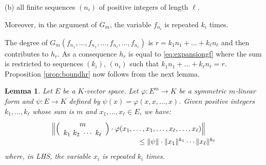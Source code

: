 \documentclass{sig-alternate}
\newtheorem{lem}[theo]{Lemma}
\def\binom#1#2{\Big(\begin{array}{cc} #1 \\ #2 \end{array}\Big)}
\begin{document}
\noindent
(b) all finite sequences $(n_i)$ of positive integers of length
$\ell$.

\noindent
Moreover, in the argument of $G_m$, the variable $f_{n_i}$ 
is repeated $k_i$ times.

The degree of $G_m(f_{n_1}, \ldots, f_{n_1}, \ldots, f_{n_\ell},
\ldots, f_{n_\ell})$ is $r = k_1 n_1 + \ldots + k_\ell n_\ell$ and 
then contributes to $h_r$. As a consequence $h_r$ is equal to 
\eqref{eq:expansiongf} where the sum is restricted to sequences
$(k_i)$, $(n_i)$ such that $k_1 n_1 + \ldots + k_\ell n_\ell = r$.
Proposition \ref{prop:boundhr} now follows from the next lemma.

\begin{lem}
Let $E$ be a $K$-vector space. Let $\varphi : E^m \to 
K$ be a symmetric $m$-linear form and $\psi: E \to K$ defined by 
$\psi(x) = \varphi(x, x, \ldots, x)$.
Given positive integers $k_1, \ldots, k_\ell$ whose sum is $m$ and 
$x_1, \ldots, x_\ell \in E$, we have:
$$\begin{array}{l}
\Big\Vert \binom m {k_1 \,\, k_2 \,\, \cdots \,\, k_\ell} \cdot
\varphi(x_1, \ldots, x_1, \ldots, x_\ell, \ldots,
x_\ell) \Big\Vert  \\
\hspace{4.3cm} \leq \Vert \psi \Vert \cdot \Vert x_1 \Vert^{k_1} \cdots
 \Vert x_\ell \Vert^{k_\ell}
\end{array}$$
where, in LHS, the variable $x_i$ is repeated $k_i$ times.
\end{lem}
\end{document}
